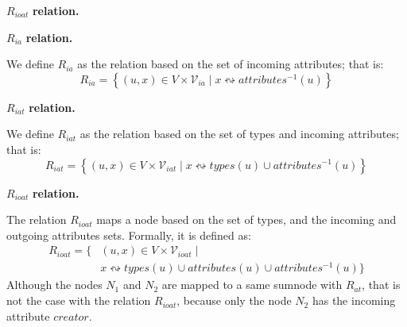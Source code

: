 \begin{labeling}{$R_{ioat}$ \textbf{relation.}}
\item[$R_{ia}$ \textbf{relation.}]

We define $R_{ia}$ as the relation based on the set of incoming attributes; that is:
\begin{equation*}
R_{ia} = \left\lbrace (u, x) \in V \times \mathcal{V}_{ia} \mid x \leftrightsquigarrow attributes^{-1}(u) \right\rbrace
\end{equation*}

\item[$R_{iat}$ \textbf{relation.}]

We define $R_{iat}$ as the relation based on the set of types and incoming attributes; that is:
\begin{equation*}
R_{iat} = \left\lbrace (u, x) \in V \times \mathcal{V}_{iat} \mid x \leftrightsquigarrow types(u) \cup attributes^{-1}(u) \right\rbrace
\end{equation*}

\item[$R_{ioat}$ \textbf{relation.}]

The relation $R_{ioat}$ maps a node based on the set of types, and the incoming and outgoing attributes sets. Formally, it is defined as:
$$
\begin{aligned}
R_{ioat} = \{ & (u, x) \in V \times \mathcal{V}_{ioat} \mid \\
& x \leftrightsquigarrow types(u) \cup attributes(u) \cup attributes^{-1}(u) \}
\end{aligned}
$$
Although the nodes $N_1$ and $N_2$ are mapped to a same sumnode with $R_{at}$, that is not the case with the relation $R_{ioat}$, because only the node $N_2$ has the incoming attribute $creator$.
\end{labeling}

